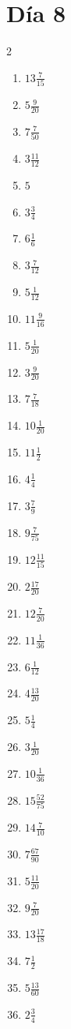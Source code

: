 \documentclass[12pt]{article}
\begin{document}
\section*{Día 8}
\begin{multicols}{2}\begin{enumerate}
\item $ 13 \frac{7}{15} $
\item $ 5 \frac{9}{20} $
\item $ 7 \frac{7}{50} $
\item $ 3 \frac{11}{12} $
\item $ 5 $
\item $ 3 \frac{3}{4} $
\item $ 6 \frac{1}{6} $
\item $ 3 \frac{7}{12} $
\item $ 5 \frac{1}{12} $
\item $ 11 \frac{9}{16} $
\item $ 5 \frac{1}{20} $
\item $ 3 \frac{9}{20} $
\item $ 7 \frac{7}{18} $
\item $ 10 \frac{1}{20} $
\item $ 11 \frac{1}{2} $
\item $ 4 \frac{1}{4} $
\item $ 3 \frac{7}{9} $
\item $ 9 \frac{7}{75} $
\item $ 12 \frac{11}{15} $
\item $ 2 \frac{17}{20} $
\item $ 12 \frac{7}{20} $
\item $ 11 \frac{1}{36} $
\item $ 6 \frac{1}{12} $
\item $ 4 \frac{13}{20} $
\item $ 5 \frac{1}{4} $
\item $ 3 \frac{1}{20} $
\item $ 10 \frac{1}{36} $
\item $ 15 \frac{52}{75} $
\item $ 14 \frac{7}{10} $
\item $ 7 \frac{67}{90} $
\item $ 5 \frac{11}{20} $
\item $ 9 \frac{7}{20} $
\item $ 13 \frac{17}{18} $
\item $ 7 \frac{1}{2} $
\item $ 5 \frac{13}{60} $
\item $ 2 \frac{3}{4} $

\end{enumerate}
\end{multicols}
\end{document}
